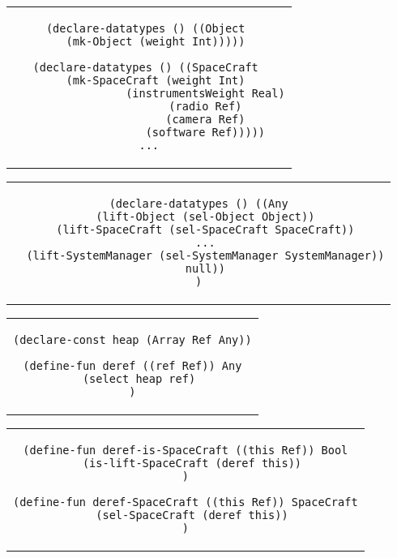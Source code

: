 \hline

\begin{center}
\begin{tabular}{c}
\begin{lstlisting}
(declare-datatypes () ((Object 
  (mk-Object (weight Int)))))
  
(declare-datatypes () ((SpaceCraft 
  (mk-SpaceCraft (weight Int)
                 (instrumentsWeight Real)
                 (radio Ref)
                 (camera Ref)
                 (software Ref)))))
...
\end{lstlisting}
\end{tabular}
\end{center}

\hline

\begin{center}
\begin{tabular}{c}
\begin{lstlisting}
(declare-datatypes () ((Any
  (lift-Object (sel-Object Object))
  (lift-SpaceCraft (sel-SpaceCraft SpaceCraft))
  ...
  (lift-SystemManager (sel-SystemManager SystemManager))
  null))
)
\end{lstlisting}
\end{tabular}
\end{center}

\hline

\begin{center}
\begin{tabular}{c}
\begin{lstlisting}
(declare-const heap (Array Ref Any))

(define-fun deref ((ref Ref)) Any
  (select heap ref)
)
\end{lstlisting}
\end{tabular}
\end{center}

\hline

\begin{center}
\begin{tabular}{c}
\begin{lstlisting}
(define-fun deref-is-SpaceCraft ((this Ref)) Bool
  (is-lift-SpaceCraft (deref this))
)

(define-fun deref-SpaceCraft ((this Ref)) SpaceCraft
  (sel-SpaceCraft (deref this))
)
\end{lstlisting}
\end{tabular}
\end{center}

\hline

